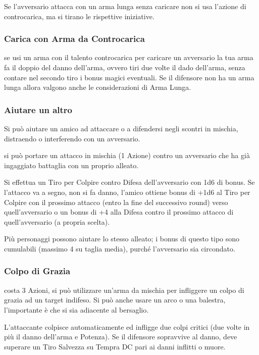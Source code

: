 \documentclass[a4paper,11pt,twoside,openany]{book}
\begin{document}
Se l'avversario attacca con un arma lunga senza caricare non si usa l'azione di controcarica, ma si tirano le rispettive iniziative.

\subsubsection{Carica con Arma da Controcarica} se usi un arma con il talento controcarica per caricare un avversario la tua arma fa il doppio del danno dell'arma, ovvero tiri due volte il dado dell'arma, senza contare nel secondo tiro i bonus magici eventuali. Se il difensore non ha un arma lunga allora valgono anche le considerazioni di Arma Lunga.

\subsubsection{Aiutare un altro} Si può aiutare un amico ad attaccare o a difendersi negli scontri in mischia, distraendo o interferendo con un avversario.

si può portare un attacco in mischia (1 Azione) contro un avversario che ha già ingaggiato battaglia con un proprio alleato.

Si effettua un Tiro per Colpire contro Difesa dell'avversario con 1d6 di bonus. Se l'attacco va a segno, non si fa danno, l'amico ottiene bonus di +1d6 al Tiro per Colpire con il prossimo attacco (entro la fine del successivo round) verso quell'avversario o un bonus di +4 alla Difesa contro il prossimo attacco di quell'avversario (a propria scelta).

Più personaggi possono aiutare lo stesso alleato; i bonus di questo tipo sono cumulabili (massimo 4 su taglia media), purché l'avversario sia circondato.

\subsubsection{Colpo di Grazia} costa 3 Azioni, si può utilizzare un'arma da mischia per infliggere un colpo di grazia ad un target indifeso. Si può anche usare un arco o una balestra, l'importante è che si sia adiacente al bersaglio.

L'attaccante colpisce automaticamente ed infligge due colpi critici (due volte in più il danno dell'arma e Potenza). Se il difensore sopravvive al danno, deve superare un Tiro Salvezza su Tempra DC pari ai danni inflitti o muore.
\end{document}
